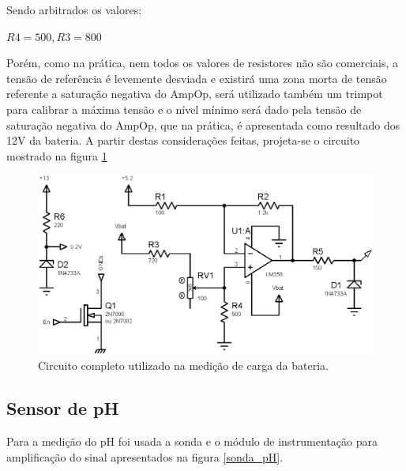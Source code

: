 Sendo arbitrados os valores:

$R4 = 500, R3 = 800$

Porém, como na prática, nem todos os valores de resistores não são comerciais, a tensão de referência é levemente desviada e existirá uma zona morta de tensão referente a saturação negativa do AmpOp, será utilizado também um trimpot para calibrar a máxima tensão e o nível mínimo será dado pela tensão de saturação negativa do AmpOp, que na prática, é apresentada como resultado dos 12V da bateria.
A partir destas considerações feitas, projeta-se o circuito mostrado na figura \ref{bateria}

\begin{figure}[h]
	\centering
	\includegraphics[keepaspectratio=true,scale=0.35]{figuras/bateria}
	\caption{ Circuito completo utilizado na medição de carga da bateria.}
	\label{bateria}
\end{figure}


\subsection{Sensor de pH}

Para a medição do pH foi usada a sonda e o módulo de instrumentação para amplificação do sinal apresentados na figura \ref{sonda_pH}.

